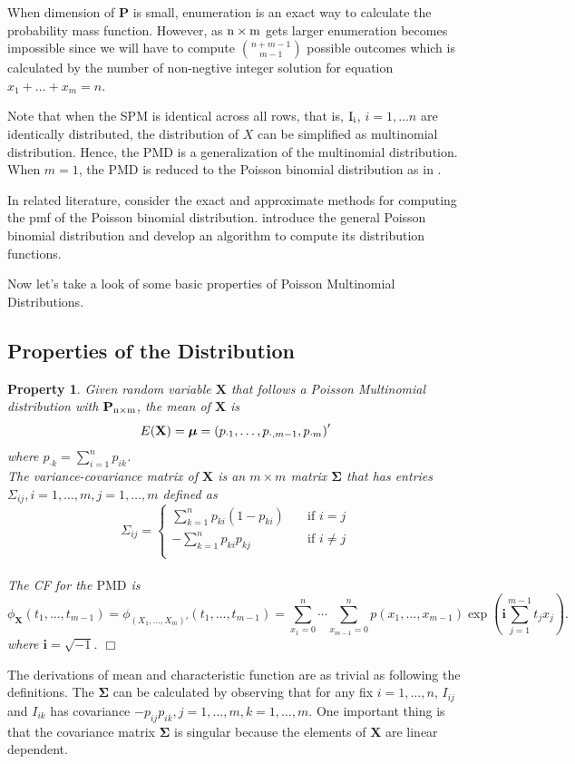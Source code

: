 \documentclass[12pt]{article}
\newcommand{\Xmat}{\mathbf{X}}
\newcommand{\Pmat}{\mathbf{P}}
\newcommand{\ivec}{{\boldsymbol{i}}}
\newcommand{\PMD}{\textrm{PMD}}
\newcommand{\Xvec}{\boldsymbol{X}}
\newcommand{\Sig}{\boldsymbol{\Sigma}}
\newcommand{\qedw}{\hfill \ensuremath{\Box}}
\newtheorem{ppt}{Property}
\begin{document}
When dimension of $\Pmat$ is small, enumeration is an exact way to calculate the probability mass function. However, as $\rm n \times m$ gets larger enumeration becomes impossible since we will have to compute $\binom{n+m-1}{m-1}$ possible outcomes which is calculated by the number of non-negtive integer solution for equation $x_1 + \dots + x_m = n$.


Note that when the SPM is identical across all rows, that is, $\rm I_{i}$, $i = 1, \dots n$ are identically distributed, the distribution of $X$ can be simplified as multinomial distribution. Hence, the $\PMD$ is a generalization of the multinomial distribution. When $m=1$, the $\PMD$ is reduced to the Poisson binomial distribution as in .

In related literature,  consider the exact and approximate methods for computing the pmf of the Poisson binomial distribution.  introduce the general Poisson binomial distribution and develop an algorithm to compute its distribution functions.

Now let's take a look of some basic properties of Poisson Multinomial Distributions.

\subsection{Properties of the Distribution}
\begin{ppt}\normalfont
Given random variable $\Xmat$ that follows a Poisson Multinomial distribution with $\Pmat_{\rm n\times m}$, the mean of $\Xmat$ is
   $$\\E(\Xmat) = \boldsymbol{\mu} = \left( p_{\cdot1} ,\dots,p_{\cdot,m-1},p_{\cdot m}\right)'$$ where $p_{\cdot k} = \sum_{i=1}^{n}p_{i k}$.\\
The variance-covariance matrix of $\Xmat$ is an $m \times m$ matrix $\Sig$ that has entries $\Sigma_{ij},i=1,\dots,m,j=1,\dots,m$ defined as
\begin{equation*}
   \Sigma_{ij} =
           \begin{cases}
             \sum_{k=1}^{n}p_{ki}(1-p_{ki}) & \quad \text{if } i=j\\
             -\sum_{k=1}^{n}p_{ki}p_{kj} & \quad \text{if } i \neq j\\
           \end{cases}
\end{equation*}\\
The CF for the $\PMD$ is
\begin{equation*}
\phi_{\Xmat}(t_1, \dots, t_{m-1}) = \phi_{(X_1,\dots,X_m)'}(t_1, \dots, t_{m-1})  =  \sum_{x_1 = 0}^{n} \cdots \sum_{x_{m-1} = 0}^n p(x_1,\ldots,x_{m-1})\exp\left(\ivec\sum_{j=1}^{m-1}t_jx_j\right).
\end{equation*}
where  $\ivec=\sqrt{-1}$.
\qedw
\end{ppt}
The derivations of mean and characteristic function are as trivial as following the definitions. The $\Sig$ can be calculated by observing that for any fix $i=1,\dots,n$, $I_{ij}$ and $I_{ik}$ has covariance $-p_{ij}p_{ik},j=1,\dots,m,k=1,\dots,m$. One important thing is that the covariance matrix $\Sig$ is singular because the elements of $\Xvec$ are linear dependent.
\end{document}
